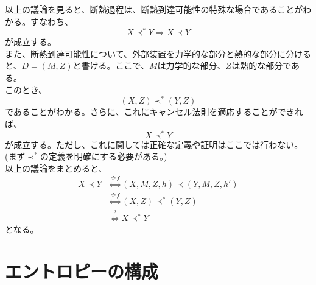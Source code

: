 \documentclass[a4paper,11pt]{jsarticle}
\numberwithin{equation}{section}
\begin{document}
以上の議論を見ると、断熱過程は、断熱到達可能性の特殊な場合であることがわかる。すなわち、
\begin{equation}
    X \prec ^* Y \Rightarrow X \prec Y
\end{equation}
が成立する。\\
また、断熱到達可能性について、外部装置を力学的な部分と熱的な部分に分けると、$D = (M,Z)$と書ける。ここで、$M$は力学的な部分、$Z$は熱的な部分である。\\
このとき、
\begin{equation}
    (X,Z) \prec^* (Y,Z)
\end{equation}
であることがわかる。さらに、これにキャンセル法則を適応することができれば、
\begin{equation}
    X \prec^* Y
\end{equation}
が成立する。ただし、これに関しては正確な定義や証明はここでは行わない。(まず$\prec^*$の定義を明確にする必要がある。)\\
以上の議論をまとめると、
\begin{align}
    X \prec Y & \overset{def}{\Leftrightarrow} (X,M,Z,h) \prec (Y,M,Z,h')\\
    &\overset{def}{\Leftrightarrow} (X,Z) \prec^* (Y,Z)\\
    &\overset{?}{\Leftrightarrow} X \prec^* Y
\end{align}
となる。\\

\newpage
\section{エントロピーの構成}
\end{document}

